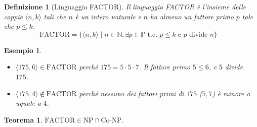 \documentclass[a4paper]{article}
\newtheorem{theorem}{Teorema}
\newtheorem{definition}{Definizione}
\newtheorem{example}{Esempio}
\begin{document}
\begin{definition}[Linguaggio FACTOR]
Il linguaggio FACTOR è l'insieme delle coppie $\langle n, k \rangle$ tali che $n$ è un intero naturale e $n$ ha almeno un fattore primo $p$ tale che $p \le k$.
\[
\text{FACTOR} = \{ \langle n, k \rangle \mid n \in \mathbb{N}, \exists p \in \mathbb{P} \text{ t.c. } p \le k \text{ e } p \text{ divide } n \}
\]
\end{definition}

\begin{example}
\begin{itemize}
    \item $\langle 175, 6 \rangle \in \text{FACTOR}$ perché $175 = 5 \cdot 5 \cdot 7$. Il fattore primo $5 \le 6$, e $5$ divide $175$.
    \item $\langle 175, 4 \rangle \notin \text{FACTOR}$ perché nessuno dei fattori primi di $175$ ($5, 7$) è minore o uguale a $4$.
\end{itemize}
\end{example}

\begin{theorem}
$\text{FACTOR} \in \text{NP} \cap \text{Co-NP}$.
\end{theorem}
\end{document}
